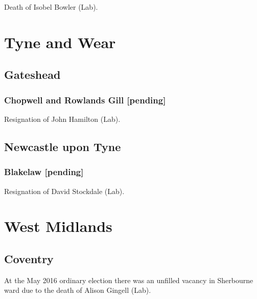 \documentclass[a4paper,openany]{book}
\begin{document}
\begin{resultsiii}
Death of Isobel Bowler (Lab).

\section{Tyne and Wear}

\subsection*{Gateshead}

\subsubsection*{Chopwell and Rowlands Gill \hspace*{\fill}\nolinebreak[1]%
\enspace\hspace*{\fill}
[pending]}


Resignation of John Hamilton (Lab).

\subsection*{Newcastle upon Tyne}

\subsubsection*{Blakelaw \hspace*{\fill}\nolinebreak[1]%
\enspace\hspace*{\fill}
[pending]}


Resignation of David Stockdale (Lab).

\section{West Midlands}

\subsection*{Coventry}

At the May 2016 ordinary election there was an unfilled vacancy in Sherbourne ward due to the death of Alison Gingell (Lab).


\end{resultsiii}
\end{document}
